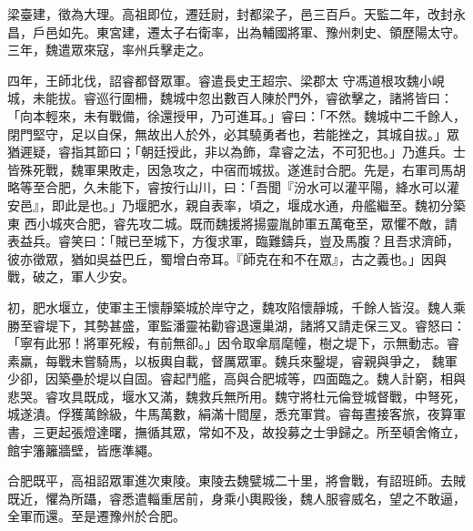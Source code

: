 \begin{pinyinscope}
 梁臺建，徵為大理。高祖即位，遷廷尉，封都梁子，邑三百戶。天監二年，改封永昌，戶邑如先。東宮建，遷太子右衛率，出為輔國將軍、豫州刺史、領歷陽太守。三年，魏遣眾來寇，率州兵擊走之。



 四年，王師北伐，詔睿都督眾軍。睿遣長史王超宗、梁郡太
 守馮道根攻魏小峴城，未能拔。睿巡行圍柵，魏城中忽出數百人陳於門外，睿欲擊之，諸將皆曰：「向本輕來，未有戰備，徐還授甲，乃可進耳。」睿曰：「不然。魏城中二千餘人，閉門堅守，足以自保，無故出人於外，必其驍勇者也，若能挫之，其城自拔。」眾猶遲疑，睿指其節曰；「朝廷授此，非以為飾，韋睿之法，不可犯也。」乃進兵。士皆殊死戰，魏軍果敗走，因急攻之，中宿而城拔。遂進討合肥。先是，右軍司馬胡略等至合肥，久未能下，睿按行山川，曰：「吾聞『汾水可以灌平陽，絳水可以灌安邑』，即此是也。」乃堰肥水，親自表率，頃之，堰成水通，舟艦繼至。魏初分築東
 西小城夾合肥，睿先攻二城。既而魏援將揚靈胤帥軍五萬奄至，眾懼不敵，請表益兵。睿笑曰：「賊已至城下，方復求軍，臨難鑄兵，豈及馬腹？且吾求濟師，彼亦徵眾，猶如吳益巴丘，蜀增白帝耳。『師克在和不在眾』，古之義也。」因與戰，破之，軍人少安。



 初，肥水堰立，使軍主王懷靜築城於岸守之，魏攻陷懷靜城，千餘人皆沒。魏人乘勝至睿堤下，其勢甚盛，軍監潘靈祐勸睿退還巢湖，諸將又請走保三叉。睿怒曰：「寧有此邪！將軍死綏，有前無卻。」因令取傘扇麾幢，樹之堤下，示無動志。睿素羸，每戰未嘗騎馬，以板輿自載，督厲眾軍。魏兵來鑿堤，睿親與爭之，
 魏軍少卻，因築壘於堤以自固。睿起鬥艦，高與合肥城等，四面臨之。魏人計窮，相與悲哭。睿攻具既成，堰水又滿，魏救兵無所用。魏守將杜元倫登城督戰，中弩死，城遂潰。俘獲萬餘級，牛馬萬數，絹滿十間屋，悉充軍賞。睿每晝接客旅，夜算軍書，三更起張燈達曙，撫循其眾，常如不及，故投募之士爭歸之。所至頓舍脩立，館宇籓籬牆壁，皆應準繩。



 合肥既平，高祖詔眾軍進次東陵。東陵去魏甓城二十里，將會戰，有詔班師。去賊既近，懼為所躡，睿悉遣輜重居前，身乘小輿殿後，魏人服睿威名，望之不敢逼，全軍而還。至是遷豫州於合肥。




\end{pinyinscope}
